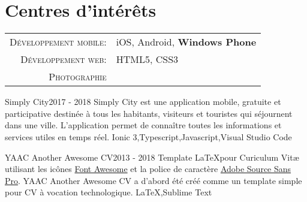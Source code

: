 \documentclass[localFont,alternative,10pt,compact]{yaac-another-awesome-cv}
\begin{document}
	\section{\texorpdfstring{\color{Blue}Centres d'intérêts}{Centres d'intérêts}}
	\begin{tabular}{rl}
	    \textsc{Développement mobile:} & iOS, Android, \textbf{Windows Phone}\\
	    \textsc{Développement web:} & HTML5, CSS3 \\ 
	    \textsc{Photographie} & \\
	\end{tabular}

	\begin{projects}
		\project
		{Simply City}{2017 - 2018}
		{ }
		{Simply City est une application mobile, gratuite et participative destinée à tous les habitants, visiteurs et touristes qui séjournent dans une ville. L’application permet de connaître toutes les informations et services utiles en temps réel.}
		{Ionic 3,Typescript,Javascript,Visual Studio Code}
				
		\project
		{YAAC Another Awesome CV}{2013 - 2018}
		{ }
		{Template \LaTeX pour Curiculum Vitæ utilisant les icônes \href{https://fontawesome.com}{Font Awesome} et la police de caractère \href{https://fonts.google.com/specimen/Source+Sans+Pro}{Adobe Source Sans Pro}. YAAC Another Awesome CV a d'abord été créé comme un template simple pour CV à vocation technologique.}
		{\LaTeX,Sublime Text}

	\end{projects}
\end{document}

